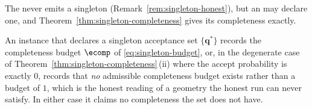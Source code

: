 
The  never emits a singleton
(Remark~\ref{rem:singleton-honest}), but an  may declare one,
and Theorem~\ref{thm:singleton-completeness} gives its completeness exactly.

\begin{requirement}\label{req:singleton-budget-record}
An instance that declares a singleton acceptance set $\{\mathbf{q}^{\ast}\}$
records the completeness budget $\ecomp$ of \eqref{eq:singleton-budget}, or,
in the degenerate case of Theorem~\ref{thm:singleton-completeness}\,(ii) where the accept
probability is exactly $0$, records that \emph{no} admissible completeness
budget exists rather than a budget of $1$, which is the honest reading of a
geometry the honest run can never satisfy. In either case it claims no
completeness the set does not have.
\end{requirement}
